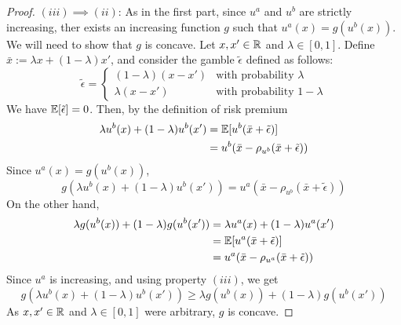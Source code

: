 \documentclass[twoside, titlepage]{article}
\begin{document}
\begin{proof}
    $(iii) \implies (ii)$: As in the first part, since $u^a$ and $u^b$ are strictly increasing, ther exists an increasing function $g$ such that $u^a(x) = g(u^b(x))$. We will need to show that $g$ is concave. Let $x, x' \in \mathbb{R}$ and $\lambda \in [0, 1]$. Define $ \bar{x} := \lambda x + (1 - \lambda)x'$, and consider the gamble $\tilde{\epsilon}$ defined as follows:
    \[
        \tilde{\epsilon} = \begin{cases}
            (1- \lambda)(x - x') & \text{with probability } \lambda \\
            \lambda(x - x') & \text{with probability } 1 - \lambda
        \end{cases}
    \]
    We have $\mathbb{E}[\tilde{\epsilon}] = 0$. Then, by the definition of risk premium
    \begin{align*}
        \lambda u^b(x) + (1 - \lambda)u^b(x') &= \mathbb{E}[u^b(\bar{x} + \tilde{\epsilon})] \\ 
        &= u^b(\bar{x} - \rho_{u^b}(\bar{x} + \tilde{\epsilon}))
    \end{align*}
    Since $u^a(x) = g(u^b(x))$,
    \[
        g(\lambda u^b(x) + (1 - \lambda)u^b(x')) = u^a(\bar{x} - \rho_{u^b}(\bar{x} + \tilde{\epsilon}))
    \]
    On the other hand,
    \begin{align*}
        \lambda g(u^b(x)) + (1 - \lambda)g(u^b(x')) &= \lambda u^a(x) + (1 - \lambda)u^a(x') \\
        &= \mathbb{E}[u^a(\bar{x} + \tilde{\epsilon})] \\
        &= u^a(\bar{x} - \rho_{u^a}(\bar{x} + \tilde{\epsilon}))
    \end{align*}
    Since $u^a$ is increasing, and using property $(iii)$, we get
    \[
        g(\lambda u^b(x) + (1 - \lambda)u^b(x')) \geq \lambda g(u^b(x)) + (1 - \lambda)g(u^b(x'))
    \]
    As $x, x' \in \mathbb{R}$ and $\lambda \in [0, 1]$ were arbitrary, $g$ is concave.
\end{proof}
\end{document}
